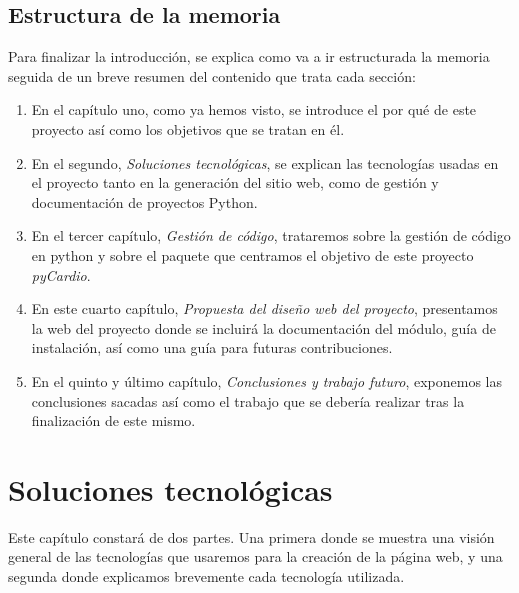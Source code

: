 \documentclass[a4paper, 12pt]{book}
\begin{document}
\section{Estructura de la memoria}
\label{sec:estruc}
Para finalizar la introducción, se explica como va a ir estructurada la memoria seguida de un breve resumen del contenido que trata cada sección: 
\begin{enumerate}
    \item En el capítulo uno, como ya hemos visto, se introduce el por qué de este proyecto así como los objetivos que se tratan en él.
    \item En el segundo, \emph{Soluciones tecnológicas}, se explican las tecnologías usadas en el proyecto tanto en la generación del sitio web, como de gestión y documentación de proyectos Python.
    \item En el tercer capítulo, \emph{Gestión de código}, trataremos sobre la gestión de código en python y sobre el paquete que centramos el objetivo de este proyecto \emph{pyCardio}.
    \item En este cuarto capítulo, \emph{Propuesta del diseño web del proyecto}, presentamos la web del proyecto donde se incluirá la documentación del módulo, guía de instalación, así como una guía para futuras contribuciones.
    \item En el quinto y último capítulo, \emph{Conclusiones y trabajo futuro}, exponemos las conclusiones sacadas así como el trabajo que se debería realizar tras la finalización de este mismo.
\end{enumerate}

\chapter{Soluciones tecnológicas}
\label{chap:Arqui}
Este capítulo constará de dos partes. Una primera donde se muestra una visión general de las tecnologías que usaremos para la creación de la página web, y una segunda donde explicamos brevemente cada tecnología utilizada.

\end{document}
